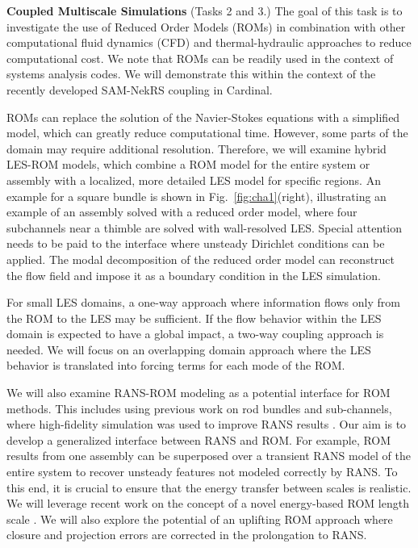 
\vspace{.08in}
\noindent \textbf{Coupled Multiscale Simulations} (Tasks 2 and 3.)
The goal of this task is to investigate the use of Reduced Order Models (ROMs)
in combination with other computational fluid dynamics (CFD) and
thermal-hydraulic approaches to reduce computational cost. We note that ROMs
can be readily used in the context of systems analysis codes. We will
demonstrate this within the context of the recently developed SAM-NekRS
coupling in Cardinal.

ROMs can replace the solution of the Navier-Stokes equations with a simplified
model, which can greatly reduce computational time. However, some parts of the
domain may require additional resolution. Therefore, we will examine hybrid
LES-ROM models, which combine a ROM model for the entire system or assembly
with a localized, more detailed LES model for specific regions. An example for
a square bundle is shown in Fig.~\ref{fig:cha1}(right), illustrating an example
of an assembly solved with a reduced order model, where four subchannels near a
thimble are solved with wall-resolved LES. Special attention needs to be paid
to the interface where unsteady Dirichlet conditions can be applied. The modal
decomposition of the reduced order model can reconstruct the flow field and
impose it as a boundary condition in the LES simulation.

For small LES domains, a one-way approach where information flows only from the
ROM to the LES may be sufficient. If the flow behavior within the LES domain is
expected to have a global impact, a two-way coupling approach is needed. We
will focus on an overlapping domain approach where the LES behavior is
translated into forcing terms for each mode of the ROM.

We will also examine RANS-ROM modeling as a potential interface for ROM
methods. This includes using previous work on rod bundles and sub-channels,
where high-fidelity simulation was used to improve RANS results
\cite{martinez2019a}.
Our aim is to develop a generalized interface between RANS and ROM. For
example, ROM results from one assembly can be superposed over a transient RANS
model of the entire system to recover unsteady features not modeled correctly
by RANS. To this end, it is crucial to ensure that the energy transfer between
scales is realistic. We will leverage recent work on the concept of a novel
energy-based ROM length scale \cite{mou2021}. We will also explore the
potential of an uplifting ROM approach \cite{ahmed2020} where closure and
projection errors are corrected in the prolongation to RANS.
\\[-2ex]

